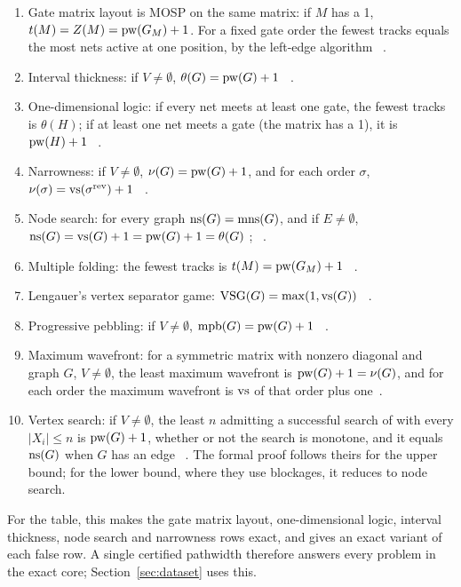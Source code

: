 \begin{theorem}\label{thm:core}
\leavevmode
\begin{enumerate}
\item Gate matrix layout is MOSP on the same matrix: if $M$ has a 1,
  $t(M)=Z(M)=\mathrm{pw}(G_M)+1$. For a fixed gate order the fewest tracks equals the
  most nets active at one position, by the left-edge algorithm
  \citep[p.~31]{LY2002ref6}~.
\item Interval thickness: if $V\ne\emptyset$, $\theta(G)=\mathrm{pw}(G)+1$
  \citep[Prop.~3.5]{LY2002ref6}~.
\item One-dimensional logic: if every net meets at least one gate, the
  fewest tracks is $\theta(H)$; if at least one net meets a gate (the matrix
  has a 1), it is $\mathrm{pw}(H)+1$
  \citep[Thm~3]{LY2002ref7}~.
\item Narrowness: if $V\ne\emptyset$, $\nu(G)=\mathrm{pw}(G)+1$, and for each order
  $\sigma$, $\nu(\sigma)=\mathrm{vs}(\sigma^{\mathrm{rev}})+1$
  \citep[Prop.~3.1]{LY2002ref11}~.
\item Node search: for every graph $\mathrm{ns}(G)=\mathrm{mns}(G)$, and if $E\ne\emptyset$,
  $\mathrm{ns}(G)=\mathrm{vs}(G)+1=\mathrm{pw}(G)+1=\theta(G)$
  \citep[Thm]{LY2002ref9}; \citep[Thms~2.3, 4.1]{LY2002ref10}~.
\item Multiple folding: the fewest tracks is $t(M)=\mathrm{pw}(G_M)+1$
  \citep[Thm~3.14]{LY2002ref6}~.
\item Lengauer's vertex separator game: $\mathrm{VSG}(G)=\max(1,\mathrm{vs}(G))$
  \citep[Thm~4]{LY2002ref14}~.
\item Progressive pebbling: if $V\ne\emptyset$, $\mathrm{mpb}(G)=\mathrm{pw}(G)+1$
  \citep[Thm~3.1]{LY2002ref10}~.
\item Maximum wavefront: for a symmetric matrix with nonzero diagonal and graph
  $G$, $V\ne\emptyset$, the least maximum wavefront is $\mathrm{pw}(G)+1=\nu(G)$, and
  for each order the maximum wavefront is $\mathrm{vs}$ of that order plus
  one~.
\item Vertex search: if $V\ne\emptyset$, the least $n$ admitting a successful
  search of \citet[\S5]{BRST1991} with every $|X_i|\le n$ is $\mathrm{pw}(G)+1$,
  whether or not the search is monotone, and it equals $\mathrm{ns}(G)$ when $G$ has an
  edge \citep[(5.1)]{BRST1991}~. The formal proof follows
  theirs for the upper bound; for the lower bound, where they use blockages,
  it reduces to node search.
\end{enumerate}
\end{theorem}
For the table, this makes the gate matrix layout, one-dimensional logic,
interval thickness, node search and narrowness rows exact, and gives an exact
variant of each false row. A single certified pathwidth therefore answers
every problem in the exact core; Section~\ref{sec:dataset} uses this.

